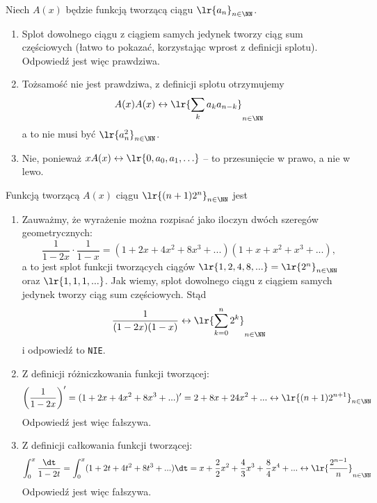\begin{solutions}
    \sol Niech $A(x)$ będzie funkcją tworzącą ciągu $\lr{a_n}_{n \in \NN}$.
    \begin{enumerate}[\bf A.]
        \item Splot dowolnego ciągu z ciągiem samych jedynek tworzy ciąg sum częściowych (łatwo to pokazać, korzystając wprost z definicji splotu). Odpowiedź jest więc prawdziwa.
        \item Tożsamość nie jest prawdziwa, z definicji splotu otrzymujemy
        $$A(x)A(x) \leftrightarrow \lr{\sum_k a_k a_{n - k}}_{n \in \NN}$$
        a to nie musi być $\lr{a_n^2}_{n \in \NN}$.
        \item Nie, ponieważ $xA(x) \leftrightarrow \lr{0, a_0, a_1, \ldots}$ -- to przesunięcie w prawo, a nie w lewo.
    \end{enumerate}

    \sol Funkcją tworzącą $A(x)$ ciągu $\lr{(n+1)2^n}_{n \in \NN}$ jest

    \begin{enumerate}[\bf A.]
        \item Zauważmy, że wyrażenie można rozpisać jako iloczyn dwóch szeregów geometrycznych:
        $$\frac{1}{1 - 2x} \cdot \frac{1}{1 - x} = (1 + 2x + 4x^2 + 8x^3 + ...)(1 + x + x^2 + x^3 + ...),$$
        a to jest splot funkcji tworzących ciągów $\lr{1, 2, 4, 8, ...} = \lr{2^n}_{n \in \NN}$ oraz $\lr{1, 1, 1, ...}$. Jak wiemy, splot dowolnego ciągu z ciągiem samych jedynek tworzy ciąg sum częściowych. Stąd $$\frac{1}{(1 - 2x)(1 - x)} \leftrightarrow \lr{\sum_{k = 0}^n 2^k}_{n \in \NN}$$
        i odpowiedź to \texttt{NIE}.

        \item Z definicji różniczkowania funkcji tworzącej:
        $$\left(\frac{1}{1 - 2x}\right)' = (1 + 2x + 4x^2 + 8x^3 + ...)' = 2 + 8x + 24x^2 + ... \leftrightarrow \lr{(n + 1)2^{n + 1}}_{n \in \NN}$$
        Odpowiedź jest więc fałszywa.

        \item Z definicji całkowania funkcji tworzącej:
        $$\int_0^x\frac{\dt}{1-2t} = \int_0^x (1 + 2t + 4t^2 + 8t^3 + ...) \dt = x + \frac{2}{2} x^2 + \frac{4}{3} x^3 + \frac{8}{4} x^4 + ... \leftrightarrow \lr{\frac{2^{n - 1}}{n}}_{n \in \NN}$$
        Odpowiedź jest więc fałszywa.
    \end{enumerate}


\end{solutions}

